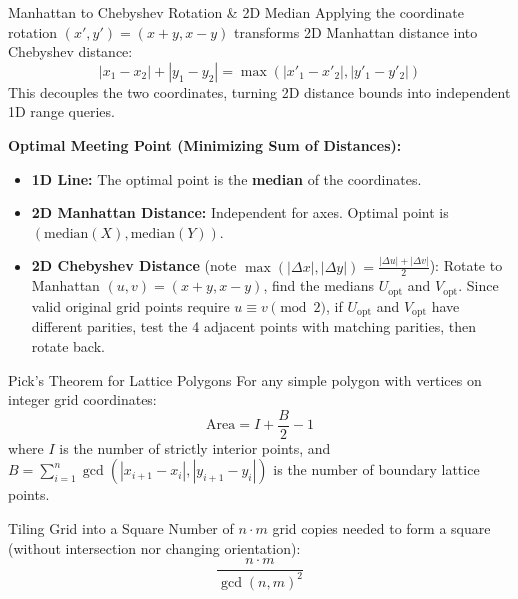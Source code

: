 \documentclass[10pt]{article}
\begin{document}
\begin{conceptbox}{Manhattan to Chebyshev Rotation \& 2D Median}
    Applying the coordinate rotation $(x', y') = (x + y, x - y)$ transforms 2D Manhattan distance into Chebyshev distance:
    \[ |x_1 - x_2| + |y_1 - y_2| = \max(|x'_1 - x'_2|, |y'_1 - y'_2|) \]
    This decouples the two coordinates, turning 2D distance bounds into independent 1D range queries.

    \textbf{Optimal Meeting Point (Minimizing Sum of Distances):}
    \begin{itemize}
        \item \textbf{1D Line:} The optimal point is the \textbf{median} of the coordinates.
        \item \textbf{2D Manhattan Distance:} Independent for axes. Optimal point is $(\text{median}(X), \text{median}(Y))$.
        \item \textbf{2D Chebyshev Distance} (note $\max(|\Delta x|, |\Delta y|) = \frac{|\Delta u| + |\Delta v|}{2}$): Rotate to Manhattan $(u, v) = (x+y, x-y)$, find the medians $U_{\text{opt}}$ and $V_{\text{opt}}$. Since valid original grid points require $u \equiv v \pmod 2$, if $U_{\text{opt}}$ and $V_{\text{opt}}$ have different parities, test the 4 adjacent points with matching parities, then rotate back.
    \end{itemize}
\end{conceptbox}

\begin{conceptbox}{Pick's Theorem for Lattice Polygons}
    For any simple polygon with vertices on integer grid coordinates:
    \[ \text{Area} = I + \frac{B}{2} - 1 \]
    where $I$ is the number of strictly interior points, and $B = \sum_{i=1}^n \gcd(|x_{i+1} - x_i|, |y_{i+1} - y_i|)$ is the number of boundary lattice points.
\end{conceptbox}

\begin{conceptbox}{Tiling Grid into a Square}
    Number of $n \cdot m$ grid copies needed to form a square (without intersection nor changing orientation):
    \[ \frac{n \cdot m}{\gcd(n, m)^2} \]
\end{conceptbox}
\end{document}
